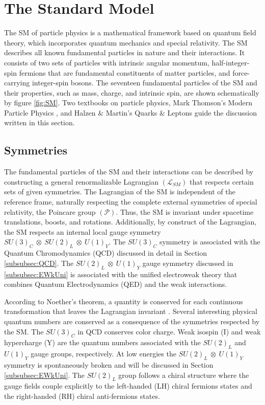 \section{The Standard Model}
\label{sec:SM}

The SM of particle physics is a mathematical framework based on quantum field theory, which incorporates quantum mechanics and special relativity. The SM describes all known fundamental particles in nature and their interactions. It consists of two sets of particles with intrinsic angular momentum, half-integer-spin fermions that are fundamental constituents of matter particles, and force-carrying integer-spin bosons. The seventeen fundamental particles of the SM and their properties, such as mass, charge, and intrinsic spin, are shown schematically by figure \ref{fig:SM}. Two textbooks on particle physics, Mark Thomson's Modern Particle Physics \cite{Thomson:2013zua}, and Halzen $\&$ Martin's Quarks $\&$ Leptons \cite{Halzen:1984mc} guide the discussion written in this section.

\subsection{Symmetries}
\label{subsec:Symmetries}
The fundamental particles of the SM and their interactions can be described by constructing a general renormalizable Lagrangian $(\mathcal{L}_{SM})$ that respects certain sets of given symmetries. The Lagrangian of the SM is independent of the reference frame, naturally respecting the complete external symmetries of special relativity, the Poincare group $(\mathcal{P})$. Thus, the SM is invariant under spacetime translations, boosts, and rotations. Additionally, by construct of the Lagrangian, the SM respects an internal local gauge symmetry $SU(3)_{C}~\otimes~SU(2)_{L}~\otimes~U(1)_{Y}$. The $SU(3)_{C}$ symmetry is associated with the Quantum Chromodynamics (QCD) discussed in detail in Section \ref{subsubsec:QCD}. The $SU(2)_{L}~\otimes~U(1)_{Y}$ gauge symmetry discussed in \ref{subsubsec:EWkUni} is associated with the unified electroweak theory that combines Quantum Electrodynamics (QED) and the weak interactions. 

According to Noether's theorem, a quantity is conserved for each continuous transformation that leaves the Lagrangian invariant \cite{NoetherTheorem}. Several interesting physical quantum numbers are conserved as a consequence of the symmetries respected by the SM. The $SU(3)_{C}$ in QCD conserves color charge. Weak isospin (I) and weak hypercharge (Y) are the quantum numbers associated with the $SU(2)_{L}$ and $U(1)_{Y}$ gauge groups, respectively. At low energies the $SU(2)_{L}~\otimes~U(1)_{Y}$ symmetry is spontaneously broken and will be discussed in Section \ref{subsubsec:EWkUni}. The $SU(2)_{L}$ group follows a chiral structure where the gauge fields couple explicitly to the left-handed (LH) chiral fermions states and the right-handed (RH) chiral anti-fermions states.

